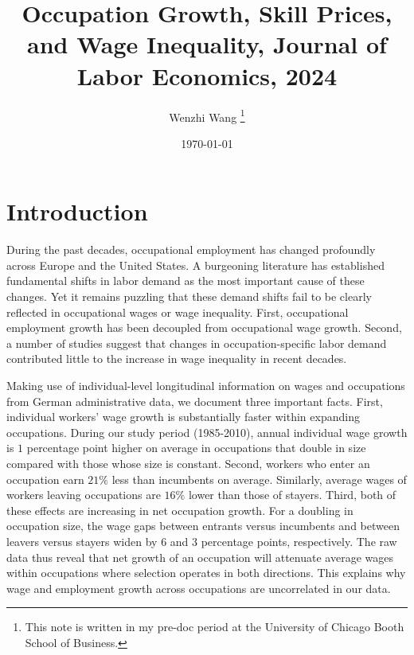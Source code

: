 \documentclass[12pt]{article}
\theoremstyle{definition}
\begin{document}
 


\title{\bf Occupation Growth, Skill Prices, and Wage Inequality, Journal of Labor Economics, 2024} 
\author{Wenzhi Wang \thanks{This note is written in my pre-doc period at the University of Chicago Booth School of Business.} } 
\date{\today} 
\maketitle 

\citet{bohmOccupationGrowthSkill2024}

\section{Introduction}

During the past decades, occupational employment has changed profoundly across Europe and the United States. A burgeoning literature has established fundamental shifts in labor demand as the most important cause of these changes. Yet it remains puzzling that these demand shifts fail to be clearly reflected in occupational wages or wage inequality. First, occupational employment growth has been decoupled from occupational wage growth. Second, a number of studies suggest that changes in occupation-specific labor demand contributed little to the increase in wage inequality in recent decades. 

Making use of individual-level longitudinal information on wages and occupations from German administrative data, we document three important facts. First, individual workers' wage growth is substantially faster within expanding occupations. During our study period (1985-2010), annual individual wage growth is $1$ percentage point higher on average in occupations that double in size compared with those whose size is constant. Second, workers who enter an occupation earn $21\%$ less than incumbents on average. Similarly, average wages of workers leaving occupations are $16\%$ lower than those of stayers. Third, both of these effects are increasing in net occupation growth. For a doubling in occupation size, the wage gaps between entrants versus incumbents and between leavers versus stayers widen by $6$ and $3$ percentage points, respectively. The raw data thus reveal that net growth of an occupation will attenuate average wages within occupations where selection operates in both directions. This explains why wage and employment growth across occupations are uncorrelated in our data. 
\end{document}
